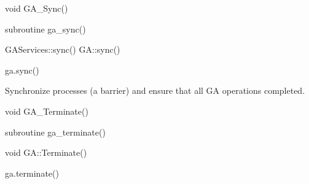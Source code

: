 \documentclass[12pt]{article}
\begin{document}
\begin{capi}
\begin{ccode}
void GA_Sync()
\end{ccode}
\end{capi}

\begin{fapi}
\begin{fcode}
subroutine ga_sync()
\end{fcode}
\end{fapi}

\begin{cxxapi}
\begin{cxxcode}
GAServices::sync()
GA::sync()
\end{cxxcode}
\end{cxxapi}

\begin{pyapi}
\begin{pycode}
ga.sync()
\end{pycode}
\end{pyapi}

\dcoll

\begin{desc}

Synchronize processes (a barrier) and ensure that all GA operations completed.

\end{desc}


\begin{capi}
\begin{ccode}
void GA_Terminate()
\end{ccode}
\end{capi}

\begin{fapi}
\begin{fcode}
subroutine ga_terminate()
\end{fcode}
\end{fapi}

\begin{cxxapi}
\begin{cxxcode}
void GA::Terminate()
\end{cxxcode}
\end{cxxapi}

\begin{pyapi}
\begin{pycode}
ga.terminate()
\end{pycode}
\end{pyapi}
\end{document}
